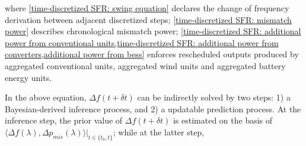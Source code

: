 \documentclass[lettersize,journal]{IEEEtran}
\begin{document}

\noinedent where \cref{time-discretized SFR: swing equation} declares the change of frequency derivation between adjacent discretized steps; \cref{time-discretized SFR: mismatch power} describes chronological mismatch power; \cref{time-discretized SFR: additional power from conventional units,time-discretized SFR: additional power from converters,additional power from bess}  enforces rescheduled outputs produced by aggregated conventional units, aggregated wind units and aggregated battery energy units.

In the above equation, \(\varDelta f(t + \delta t)\) can be indirectly solved by two steps: 1) a Bayesian-derived inference process, and 2) a updatable prediction process. At the inference step, the prior value of \(\varDelta f(t + \delta t)\) is estimated on the basis of \(\langle \varDelta f( \lambda), \varDelta p_{mis}( \lambda )\rangle|_{t\in\{t_0, t\}}\); while at the latter step,


\end{document}
